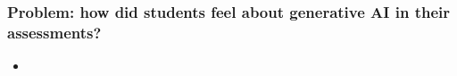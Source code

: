 \documentclass[xcolor={dvipsnames},aspectratio=169]{beamer}
\begin{document}
\begin{frame}
\frametitle{Problem: how did students feel about generative AI in their assessments?}

\begin{itemize}
    \item 
\end{itemize}

\end{frame}

















\end{document}
